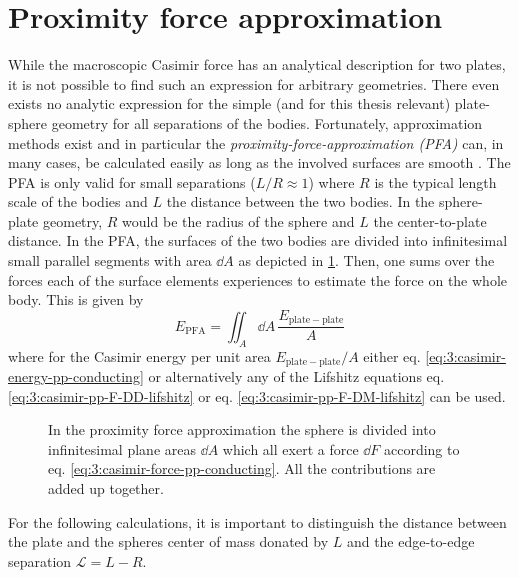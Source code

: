 \section{Proximity force approximation}\label{sec:3:pfa}

While the macroscopic Casimir force has an analytical description for two plates, it is not possible to find such an expression for arbitrary geometries. There even exists no analytic expression for the
simple (and for this thesis relevant) plate-sphere geometry for all separations of the bodies.
Fortunately, approximation methods exist and in particular the \emph{proximity-force-approximation (PFA)} can, in many cases, be calculated easily as long as the involved surfaces are smooth \cite{Hartmann_2018,Emig_2007a,Bulgac_2006}.
The PFA is only valid for small separations ($L/R \approx 1$) where $R$ is the typical length scale of the bodies and $L$ the distance between the two bodies.
In the sphere-plate geometry, $R$ would be the radius of the sphere and $L$ the center-to-plate distance.
In the PFA, the surfaces of the two bodies are divided into infinitesimal small parallel segments with area $\dd A$ as depicted in \cref{fig:3:PFA}.
Then, one sums over the forces each of the surface elements experiences to estimate the force on the whole body. This is given by
\begin{equation}\label{eq:3:pfa}
  E_\mathrm{PFA} = \iint_A \dd A \, \frac{E_\mathrm{plate-plate}}{A}
\end{equation}
where for the Casimir energy per unit area $E_\mathrm{plate-plate}/A$ either eq. \eqref{eq:3:casimir-energy-pp-conducting} or alternatively any of the Lifshitz equations eq. \eqref{eq:3:casimir-pp-F-DD-lifshitz} or eq. \eqref{eq:3:casimir-pp-F-DM-lifshitz} can be used.
\begin{figure}[!htbp]
  \centering
  \def\svgwidth{0.55\textwidth}
  
  \caption{In the proximity force approximation the sphere is divided into infinitesimal plane areas $\dd A$ which all exert a force $\dd F$ according to eq. \eqref{eq:3:casimir-force-pp-conducting}. All the contributions are added up together.}
  \label{fig:3:PFA}
\end{figure}
For the following calculations, it is important to distinguish the distance between the plate and the spheres center of mass donated by $L$ and the edge-to-edge separation $\mathscr{L} = L - R$.

